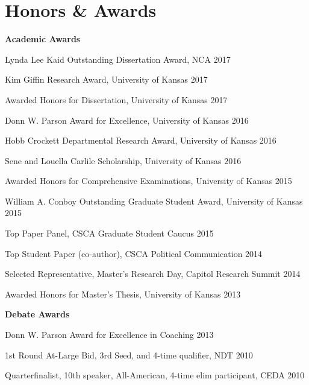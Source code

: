 
\section{Honors \& \hspace{5mm} Awards}
\textbf{Academic Awards}
  \begin{innerlist}
    \item Lynda Lee Kaid Outstanding Dissertation Award, NCA                         \hfill 2017
    \item Kim Giffin Research Award, University of Kansas                            \hfill 2017
    \item Awarded Honors for Dissertation, University of Kansas                      \hfill 2017
    \item Donn W. Parson Award for Excellence, University of Kansas                  \hfill 2016
    \item Hobb Crockett Departmental Research Award, University of Kansas            \hfill 2016
    \item Sene and Louella Carlile Scholarship, University of Kansas                 \hfill 2016
    \item Awarded Honors for Comprehensive Examinations, University of Kansas        \hfill 2015
    \item William A. Conboy Outstanding Graduate Student Award, University of Kansas \hfill 2015
    \item Top Paper Panel, CSCA Graduate Student Caucus                              \hfill 2015
    \item Top Student Paper (co-author), CSCA Political Communication                \hfill 2014
    \item Selected Representative, Master's Research Day, Capitol Research Summit    \hfill 2014
    \item Awarded Honors for Master's Thesis, University of Kansas                   \hfill 2013
  \end{innerlist}\vspace{1em}

\textbf{Debate Awards}
  \begin{innerlist}
    \item Donn W. Parson Award for Excellence in Coaching                            \hfill 2013
    \item 1st Round At-Large Bid, 3rd Seed, and 4-time qualifier, NDT                \hfill 2010
    \item Quarterfinalist, 10th speaker, All-American, 4-time elim participant, CEDA \hfill 2010
  \end{innerlist}\vspace{-.075in}

